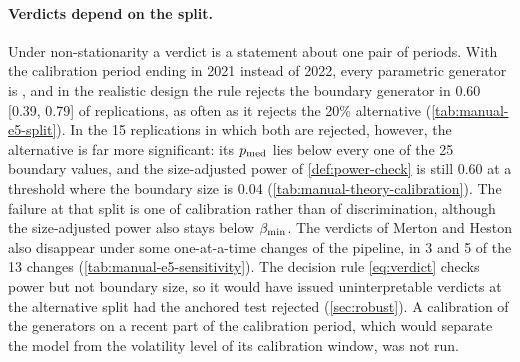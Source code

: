 \paragraph{Verdicts depend on the split.}
Under non-stationarity a verdict is a statement about one pair of periods. With the calibration
period ending in 2021 instead of 2022, every parametric generator is \INCONCL{}, and in the realistic design
the rule rejects the boundary generator in 0.60 [0.39, 0.79] of replications, as often as it
rejects the 20\% alternative (\cref{tab:manual-e5-split}). In the 15 replications in which both
are rejected, however, the alternative is far more significant: its $p_{\mathrm{med}}$ lies below every one
of the 25 boundary values, and the size-adjusted power of \cref{def:power-check} is still 0.60 at
a threshold where the boundary size is 0.04 (\cref{tab:manual-theory-calibration}). The failure
at that split is one of calibration rather than of discrimination, although the size-adjusted
power also stays below $\beta_{\min}$. The \BAD{}
verdicts of Merton and Heston also disappear under some one-at-a-time changes of the pipeline,
in 3 and 5 of the 13 changes (\cref{tab:manual-e5-sensitivity}). The decision rule
\eqref{eq:verdict} checks power but not boundary size, so it would have issued uninterpretable
\BAD{} verdicts at the alternative split had the anchored test rejected (\cref{sec:robust}). A
calibration of the generators on a recent part of the calibration period, which would separate
the model from the volatility level of its calibration window, was not run.

